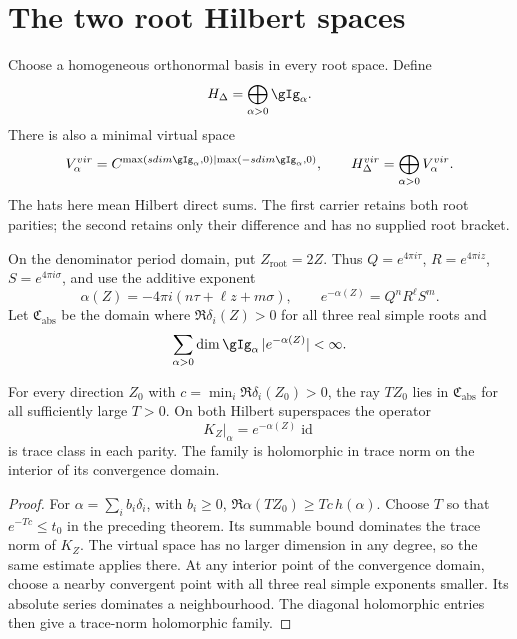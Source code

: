 \section{The two root Hilbert spaces}
Choose a homogeneous orthonormal basis in every root space. Define
\[
 \mathcal H_\Delta=\widehat{\bigoplus}_{\alpha>0}\gIg_\alpha.
\]
There is also a minimal virtual space
\[
 V^{\mathrm{vir}}_\alpha
  =\mathbb C^{\max(\operatorname{sdim}\gIg_\alpha,0)
                  \mid\max(-\operatorname{sdim}\gIg_\alpha,0)},
 \qquad
 \mathcal H^{\mathrm{vir}}_\Delta
       =\widehat{\bigoplus}_{\alpha>0}V^{\mathrm{vir}}_\alpha.
\]
The hats here mean Hilbert direct sums. The first carrier retains
both root parities; the second retains only their difference and
has no supplied root bracket.

On the denominator period domain, put \(Z_{\mathrm{root}}=2Z\).
Thus \(Q=e^{4\pi i\tau}\), \(R=e^{4\pi iz}\),
\(S=e^{4\pi i\sigma}\), and use the additive exponent
\[
 \alpha(Z)=-4\pi i(n\tau+\ell z+m\sigma),\qquad
 e^{-\alpha(Z)}=Q^nR^\ell S^m.
\]
Let \(\mathfrak C_{\mathrm{abs}}\) be the domain where
\(\Re\delta_i(Z)>0\) for all three real simple roots and
\[
 \sum_{\alpha>0}\dim\gIg_\alpha\,
                  |e^{-\alpha(Z)}|<\infty.
\]

\begin{theorem}
For every direction \(Z_0\) with
\(c=\min_i\Re\delta_i(Z_0)>0\), the ray \(TZ_0\) lies
in \(\mathfrak C_{\mathrm{abs}}\) for all sufficiently large
\(T>0\). On both Hilbert superspaces the operator
\[
 K_Z|_\alpha=e^{-\alpha(Z)}\operatorname{id}
\]
is trace class in each parity. The family is holomorphic in trace
norm on the interior of its convergence domain.
\end{theorem}
\begin{proof}
For \(\alpha=\sum_i b_i\delta_i\), with \(b_i\geq0\),
\(\Re\alpha(TZ_0)\geq Tc\,h(\alpha)\). Choose \(T\)
so that \(e^{-Tc}\leq t_0\) in the preceding theorem. Its
summable bound dominates the trace norm of \(K_Z\). The virtual
space has no larger dimension in any degree, so the same estimate
applies there. At any interior point of the convergence domain,
choose a nearby convergent point with all three real simple
exponents smaller. Its absolute series dominates a neighbourhood.
The diagonal holomorphic entries then give a trace-norm holomorphic
family.
\end{proof}

